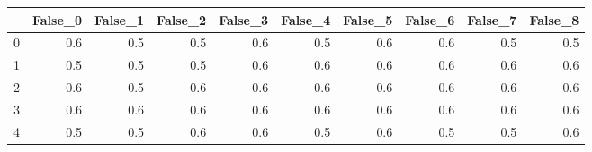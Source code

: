 \begin{tabular}{lrrrrrrrrr}
\toprule
{} &  False\_0 &  False\_1 &  False\_2 &  False\_3 &  False\_4 &  False\_5 &  False\_6 &  False\_7 &  False\_8 \\ \hline
\midrule
0 &      0.6 &      0.5 &      0.5 &      0.6 &      0.5 &      0.6 &      0.6 &      0.5 &      0.5 \\ \hline
1 &      0.5 &      0.5 &      0.5 &      0.6 &      0.6 &      0.6 &      0.6 &      0.6 &      0.6 \\ \hline
2 &      0.6 &      0.5 &      0.6 &      0.6 &      0.6 &      0.6 &      0.6 &      0.6 &      0.6 \\ \hline
3 &      0.6 &      0.6 &      0.6 &      0.6 &      0.6 &      0.6 &      0.6 &      0.6 &      0.6 \\ \hline
4 &      0.5 &      0.5 &      0.6 &      0.6 &      0.5 &      0.6 &      0.5 &      0.5 &      0.6 \\ \hline
\bottomrule
\end{tabular}
